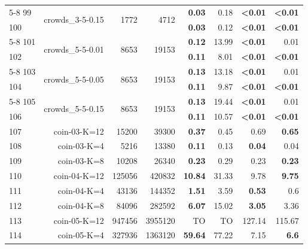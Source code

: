 \begin{longtable}{lrr@{\hskip 12pt}r@{\hskip 12pt}r@{\hskip 12pt}r@{\hskip 12pt}r@{\hskip 12pt}r}
\cmidrule{5-8}
99 & \multirow{2}{*}{crowds\_3-5-0.15} & \multirow{2}{*}{1772} & \multirow{2}{*}{4712} & \textbf{0.03} & 0.18 & \textbf{<0.01} & \textbf{<0.01} \\
100 &  &  &  & \textbf{0.03} & 0.12 & \textbf{<0.01} & \textbf{<0.01} \\
\cmidrule{5-8}
101 & \multirow{2}{*}{crowds\_5-5-0.01} & \multirow{2}{*}{8653} & \multirow{2}{*}{19153} & \textbf{0.12} & 13.99 & \textbf{<0.01} & 0.01 \\
102 &  &  &  & \textbf{0.11} & 8.01 & \textbf{<0.01} & \textbf{<0.01} \\
\cmidrule{5-8}
103 & \multirow{2}{*}{crowds\_5-5-0.05} & \multirow{2}{*}{8653} & \multirow{2}{*}{19153} & \textbf{0.13} & 13.18 & \textbf{<0.01} & 0.01 \\
104 &  &  &  & \textbf{0.11} & 9.87 & \textbf{<0.01} & \textbf{<0.01} \\
\cmidrule{5-8}
105 & \multirow{2}{*}{crowds\_5-5-0.15} & \multirow{2}{*}{8653} & \multirow{2}{*}{19153} & \textbf{0.13} & 19.44 & \textbf{<0.01} & 0.01 \\
106 &  &  &  & \textbf{0.11} & 10.57 & \textbf{<0.01} & \textbf{<0.01} \\
\midrule
107 & \multirow{1}{*}{coin-03-K=12} & \multirow{1}{*}{15200} & \multirow{1}{*}{39300} & \textbf{0.37} & 0.45 & 0.69 & \textbf{0.65} \\
108 & \multirow{1}{*}{coin-03-K=4} & \multirow{1}{*}{5216} & \multirow{1}{*}{13380} & \textbf{0.11} & 0.13 & \textbf{0.04} & 0.04 \\
109 & \multirow{1}{*}{coin-03-K=8} & \multirow{1}{*}{10208} & \multirow{1}{*}{26340} & \textbf{0.23} & 0.29 & 0.23 & \textbf{0.23} \\
110 & \multirow{1}{*}{coin-04-K=12} & \multirow{1}{*}{125056} & \multirow{1}{*}{420832} & \textbf{10.84} & 31.33 & 9.78 & \textbf{9.75} \\
111 & \multirow{1}{*}{coin-04-K=4} & \multirow{1}{*}{43136} & \multirow{1}{*}{144352} & \textbf{1.51} & 3.59 & \textbf{0.53} & 0.6 \\
112 & \multirow{1}{*}{coin-04-K=8} & \multirow{1}{*}{84096} & \multirow{1}{*}{282592} & \textbf{6.07} & 15.02 & \textbf{3.05} & 3.36 \\
113 & \multirow{1}{*}{coin-05-K=12} & \multirow{1}{*}{947456} & \multirow{1}{*}{3955120} & TO & TO & 127.14 & 115.67 \\
114 & \multirow{1}{*}{coin-05-K=4} & \multirow{1}{*}{327936} & \multirow{1}{*}{1363120} & \textbf{59.64} & 77.22 & 7.15 & \textbf{6.6} \\

\end{longtable}
